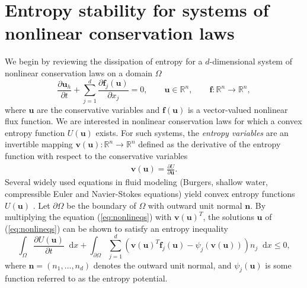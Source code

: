 \documentclass{svjour3}                     %
\newcommand*\diff[1]{\mathop{}\!{\mathrm{d}#1}}
\newcommand{\pd}[2]{\frac{\partial#1}{\partial#2}}
\newcommand{\LRp}[1]{\left( #1 \right)}
\renewcommand{\note}[1]{{\color{blue}{#1}}}
\begin{document}


\section{Entropy stability for systems of nonlinear conservation laws}
\label{sec:nonlin} 

We begin by reviewing the dissipation of entropy for a $d$-dimensional system of nonlinear conservation laws on a domain $\Omega$
\begin{equation}
\pd{\bm{u}_h}{t}  + \sum_{j=1}^d\pd{\bm{f}_j(\bm{u})}{x_j} = 0, \qquad \bm{u}\in \mathbb{R}^n, \qquad \bm{f}:\mathbb{R}^n\rightarrow\mathbb{R}^n,
\label{eq:nonlineqs}
\end{equation}
where $\bm{u}$ are the conservative variables and $\bm{f}(\bm{u})$ is a vector-valued nonlinear flux function.  We are interested in nonlinear conservation laws for which a convex entropy function $U(\bm{u})$ exists.  For such systems, the  \emph{entropy variables} are an invertible mapping $\bm{v}(\bm{u}):\mathbb{R}^n\rightarrow \mathbb{R}^n$ defined as the derivative of the entropy function with respect to the conservative variables 
\begin{align}
\bm{v}(\bm{u}) = \pd{U}{\bm{u}}.%
\label{eq:entropyvarsmap}
\end{align}
Several widely used equations in fluid modeling (Burgers, shallow water, compressible Euler and Navier-Stokes equations) yield convex entropy functions $U(\bm{u})$ \cite{hughes1986new, chen2017entropy}.  Let $\partial \Omega$ be the boundary of $\Omega$ with outward unit normal $\bm{n}$.  By multiplying the equation (\ref{eq:nonlineqs}) with $\bm{v}(\bm{u})^T$, the solutions $\bm{u}$ of (\ref{eq:nonlineqs}) can be shown to satisfy an entropy inequality
\begin{equation}
\int_{\Omega}\pd{U(\bm{u})}{t}\diff{x} + \int_{\partial \Omega} \sum_{j=1}^d \LRp{\bm{v}(\bm{u})^T\bm{f}_j(\bm{u}) - \psi_j\LRp{\bm{v}(\bm{u})}}n_j \diff{x} \leq 0, 
\label{eq:entropyineq}
\end{equation}
where $\bm{n} = \LRp{n_1,\ldots,n_d}$ denotes the outward unit normal, and $\psi_j(\bm{u})$ is some function referred to as the entropy potential.  
\end{document}
